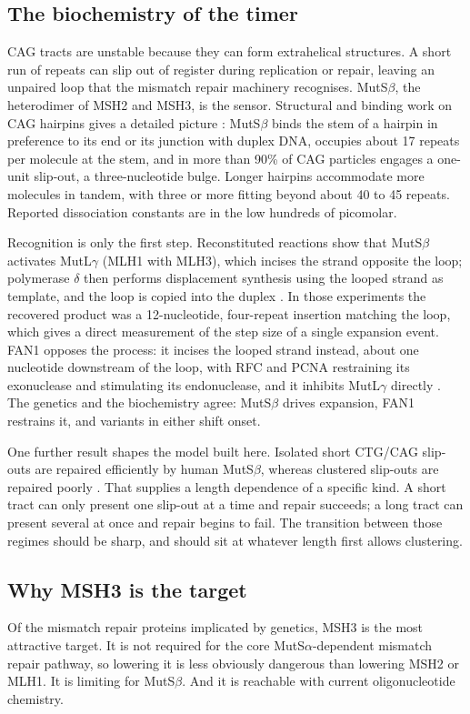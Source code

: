 \documentclass[conference]{IEEEtran}
\begin{document}
\subsection{The biochemistry of the timer}
\label{sec:1.3}
CAG tracts are unstable because they can form extrahelical structures. A short run of repeats can slip out of register during replication or repair, leaving an unpaired loop that the mismatch repair machinery recognises. MutS$\beta$, the heterodimer of MSH2 and MSH3, is the sensor. Structural and binding work on CAG hairpins gives a detailed picture \cite{tandem}: MutS$\beta$ binds the stem of a hairpin in preference to its end or its junction with duplex DNA, occupies about 17 repeats per molecule at the stem, and in more than 90\% of CAG particles engages a one-unit slip-out, a three-nucleotide bulge. Longer hairpins accommodate more molecules in tandem, with three or more fitting beyond about 40 to 45 repeats. Reported dissociation constants are in the low hundreds of picomolar.

Recognition is only the first step. Reconstituted reactions show that MutS$\beta$ activates MutL$\gamma$ (MLH1 with MLH3), which incises the strand opposite the loop; polymerase $\delta$ then performs displacement synthesis using the looped strand as template, and the loop is copied into the duplex \cite{senoussi}. In those experiments the recovered product was a 12-nucleotide, four-repeat insertion matching the loop, which gives a direct measurement of the step size of a single expansion event. FAN1 opposes the process: it incises the looped strand instead, about one nucleotide downstream of the loop, with RFC and PCNA restraining its exonuclease and stimulating its endonuclease, and it inhibits MutL$\gamma$ directly \cite{senoussi}. The genetics and the biochemistry agree: MutS$\beta$ drives expansion, FAN1 restrains it, and variants in either shift onset.

One further result shapes the model built here. Isolated short CTG/CAG slip-outs are repaired efficiently by human MutS$\beta$, whereas clustered slip-outs are repaired poorly \cite{panigrahi}. That supplies a length dependence of a specific kind. A short tract can only present one slip-out at a time and repair succeeds; a long tract can present several at once and repair begins to fail. The transition between those regimes should be sharp, and should sit at whatever length first allows clustering.

\subsection{Why MSH3 is the target}
\label{sec:1.4}
Of the mismatch repair proteins implicated by genetics, MSH3 is the most attractive target. It is not required for the core MutS$\alpha$-dependent mismatch repair pathway, so lowering it is less obviously dangerous than lowering MSH2 or MLH1. It is limiting for MutS$\beta$. And it is reachable with current oligonucleotide chemistry.
\end{document}
